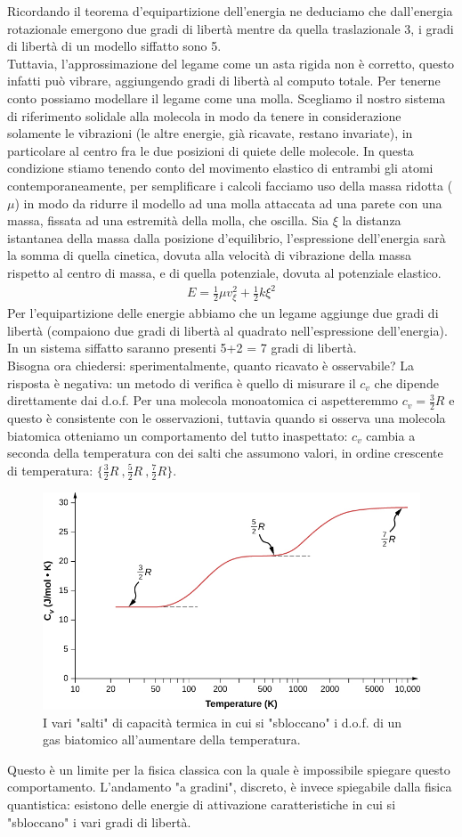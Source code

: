 \documentclass[10pt,a4paper]{article}
\begin{document}
Ricordando il teorema d'equipartizione dell'energia ne deduciamo che dall'energia rotazionale emergono due gradi di libertà mentre da quella traslazionale 3, i gradi di libertà di un modello siffatto sono 5.\\
Tuttavia, l'approssimazione del legame come un asta rigida non è corretto, questo infatti può vibrare, aggiungendo gradi di libertà al computo totale. Per tenerne conto possiamo modellare il legame come una molla. Scegliamo il nostro sistema di riferimento solidale alla molecola in modo da tenere in considerazione solamente le vibrazioni (le altre energie, già ricavate, restano invariate), in particolare al centro fra le due posizioni di quiete delle molecole. In questa condizione stiamo tenendo conto del movimento elastico di entrambi gli atomi contemporaneamente, per semplificare i calcoli facciamo uso della massa ridotta ($\mu$) in modo da ridurre il modello ad una molla attaccata ad una parete con una massa, fissata ad una estremità della molla, che oscilla. Sia $\xi$ la distanza istantanea della massa dalla posizione d'equilibrio, l'espressione dell'energia sarà la somma di quella cinetica, dovuta alla velocità di vibrazione della massa rispetto al centro di massa, e di quella potenziale, dovuta al potenziale elastico. 
\begin{align*} 
	E = \frac{1}{2}\mu v_{\xi}^2+\frac{1}{2}k\xi^2
\end{align*} 
Per l'equipartizione delle energie abbiamo che un legame aggiunge due gradi di libertà (compaiono due gradi di libertà al quadrato nell'espressione dell'energia). In un sistema siffatto saranno presenti 5+2 = 7 gradi di libertà.\\
Bisogna ora chiedersi: sperimentalmente, quanto ricavato è osservabile? La risposta è negativa: un metodo di verifica è quello di misurare il $c_v$ che dipende direttamente dai d.o.f. Per una molecola monoatomica ci aspetteremmo $c_v = \frac{3}{2} R$ e questo è consistente con le osservazioni, tuttavia quando si osserva una molecola biatomica otteniamo un comportamento del tutto inaspettato: $c_v$ cambia a seconda della temperatura con dei salti che assumono valori, in ordine crescente di temperatura: $\{\frac{3}{2}R\ , \frac{5}{2}R\ ,\frac{7}{2}R\}$. 
\begin{figure}[h!]
	\centering
	\includegraphics[width=0.6\linewidth]{../images/c_su_T_biatomiche}
	\caption{I vari "salti" di capacità termica in cui si "sbloccano" i d.o.f. di un gas biatomico all'aumentare della temperatura.}
	\label{fig:csutbiatomiche}
\end{figure}
\FloatBarrier
Questo è un limite per la fisica classica con la quale è impossibile spiegare questo comportamento. L'andamento "a gradini", discreto, è invece spiegabile dalla fisica quantistica: esistono delle energie di attivazione caratteristiche in cui si "sbloccano" i vari gradi di libertà. 
\end{document}
